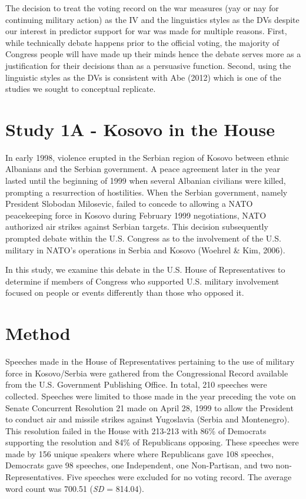 \documentclass[
  english,
  ,man,floatsintext]{apa6}
\begin{document}
The decision to treat the voting record on the war measures (yay or nay for continuing military action) as the IV and the linguistics styles as the DVs despite our interest in predictor support for war was made for multiple reasons. First, while technically debate happens prior to the official voting, the majority of Congress people will have made up their minds hence the debate serves more as a justification for their decisions than as a persuasive function. Second, using the linguistic styles as the DVs is consistent with Abe (2012) which is one of the studies we sought to conceptual replicate.

\hypertarget{study-1a---kosovo-in-the-house}{%
\section{Study 1A - Kosovo in the House}\label{study-1a---kosovo-in-the-house}}

In early 1998, violence erupted in the Serbian region of Kosovo between ethnic Albanians and the Serbian government. A peace agreement later in the year lasted until the beginning of 1999 when several Albanian civilians were killed, prompting a resurrection of hostilities. When the Serbian government, namely President Slobodan Milosevic, failed to concede to allowing a NATO peacekeeping force in Kosovo during February 1999 negotiations, NATO authorized air strikes against Serbian targets. This decision subsequently prompted debate within the U.S. Congress as to the involvement of the U.S. military in NATO's operations in Serbia and Kosovo (Woehrel \& Kim, 2006).

In this study, we examine this debate in the U.S. House of Representatives to determine if members of Congress who supported U.S. military involvement focused on people or events differently than those who opposed it.

\hypertarget{method}{%
\section{Method}\label{method}}

Speeches made in the House of Representatives pertaining to the use of military force in Kosovo/Serbia were gathered from the Congressional Record available from the U.S. Government Publishing Office. In total, 210 speeches were collected. Speeches were limited to those made in the year preceding the vote on Senate Concurrent Resolution 21 made on April 28, 1999 to allow the President to conduct air and missile strikes against Yugoslavia (Serbia and Montenegro). This resolution failed in the House with 213-213 with 86\% of Democrats supporting the resolution and 84\% of Republicans opposing. These speeches were made by 156 unique speakers where where Republicans gave 108 speeches, Democrats gave 98 speeches, one Independent, one Non-Partisan, and two non-Representatives. Five speeches were excluded for no voting record. The average word count was 700.51 (\emph{SD} = 814.04).
\end{document}
